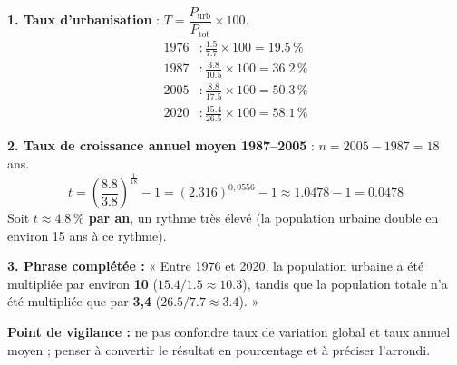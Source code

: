 \documentclass[11pt]{article}
\begin{document}
\begin{corrige}
\textbf{1. Taux d'urbanisation} : $T = \dfrac{P_{\text{urb}}}{P_{\text{tot}}} \times 100$.
\begin{align*}
1976 &: \frac{\num{1,5}}{\num{7,7}}\times 100 = \num{19,5}\,\% \\
1987 &: \frac{\num{3,8}}{\num{10,5}}\times 100 = \num{36,2}\,\% \\
2005 &: \frac{\num{8,8}}{\num{17,5}}\times 100 = \num{50,3}\,\% \\
2020 &: \frac{\num{15,4}}{\num{26,5}}\times 100 = \num{58,1}\,\%
\end{align*}

\textbf{2. Taux de croissance annuel moyen 1987--2005} : $n = 2005 - 1987 = 18$ ans.
\[
t = \left(\frac{\num{8,8}}{\num{3,8}}\right)^{\frac{1}{18}} - 1 = (\num{2,316})^{0,0556} - 1 \approx \num{1,0478} - 1 = \num{0,0478}
\]
Soit \textbf{$t \approx \num{4,8}\,\%$ par an}, un rythme très élevé (la population urbaine double en environ 15 ans à ce rythme).

\textbf{3. Phrase complétée :} « Entre 1976 et 2020, la population urbaine a été multipliée par environ \textbf{10} ($\num{15,4}/\num{1,5} \approx \num{10,3}$), tandis que la population totale n'a été multipliée que par \textbf{3,4} ($\num{26,5}/\num{7,7} \approx \num{3,4}$). »

\textbf{Point de vigilance :} ne pas confondre taux de variation global et taux annuel moyen ; penser à convertir le résultat en pourcentage et à préciser l'arrondi.
\end{corrige}
\end{document}
